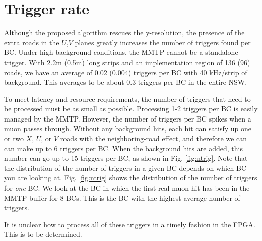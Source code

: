 \section{Trigger rate}
\label{sec:trigrate}

Although the proposed algorithm rescues the y-resolution, the presence of the extra roads in the $U$,$V$ planes greatly increases the number of triggers found per BC. Under high background conditions, the MMTP cannot be a standalone trigger. With 2.2m (0.5m) long strips and an implementation region of 136 (96) roads, we have an average of 0.02 (0.004) triggers per BC with 40 kHz/strip of background. This averages to be about 0.3 triggers per BC in the entire NSW. 
\par To meet latency and resource requirements, the number of triggers that need to be processed must be as small as possible. Processing 1-2 triggers per BC is easily managed by the MMTP. However, the number of triggers per BC spikes when a muon passes through. Without any background hits, each hit can satisfy up one or two $X$, $U$, or $V$ roads with the neighboring-road effect, and therefore we can can make up to 6 triggers per BC. When the background hits are added, this number can go up to 15 triggers per BC, as shown in Fig. \ref{fig:ntrig}. Note that the distribution of the number of triggers in a given BC depends on which BC you are looking at. Fig. \ref{fig:ntrig} shows the distribution of the number of triggers for \textit{one} BC. We look at the BC in which the first real muon hit has been in the MMTP buffer for 8 BCs. This is the BC with the highest average number of triggers.
\par It is unclear how to process all of these triggers in a timely fashion in the FPGA. This is to be determined.
